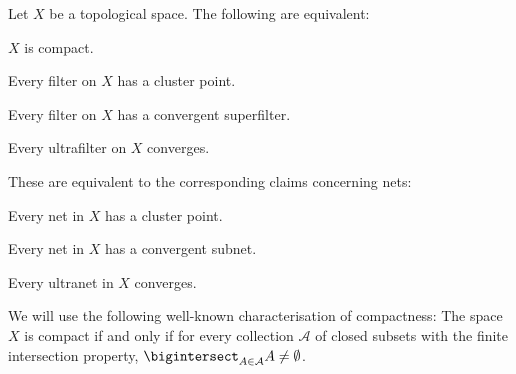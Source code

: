 \documentclass[article, a4paper, 11pt, oneside]{memoir}
\numberwithin{equation}{chapter}
\newcommand{\calA}{\mathcal{A}}
\theoremstyle{nonumberplain}
\begin{document}
\begin{proposition}
    \label{thm:compactness-equivalent}
    Let $X$ be a topological space. The following are equivalent:
    \begin{enumprop}
        \item \label{enum:space-compact} $X$ is compact.
        \item \label{enum:every-filter-cluster} Every filter on $X$ has a cluster point.
        \item \label{enum:every-filter-convergent-superfilter} Every filter on $X$ has a convergent superfilter.
        \item \label{enum:every-ultrafilter-converges} Every ultrafilter on $X$ converges.
    \end{enumprop}
    These are equivalent to the corresponding claims concerning nets:
    \begin{enumprop}[resume]
        \item Every net in $X$ has a cluster point.
        \item Every net in $X$ has a convergent subnet.
        \item Every ultranet in $X$ converges.
    \end{enumprop}
\end{proposition}
%
We will use the following well-known characterisation of compactness: The space $X$ is compact if and only if for every collection $\calA$ of closed subsets with the finite intersection property, $\bigintersect_{A \in \calA} A \neq \emptyset$.
\end{document}
